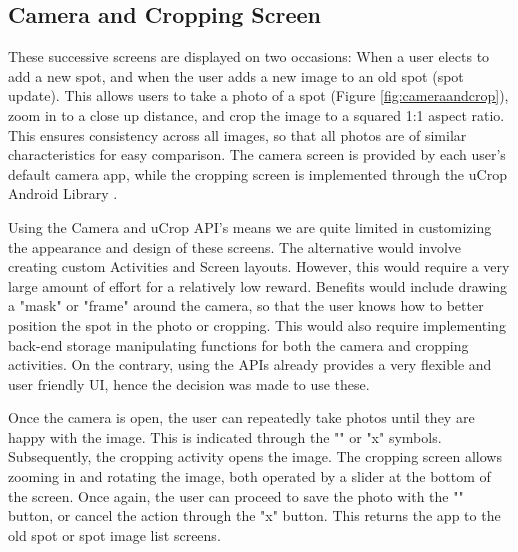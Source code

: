 \subsection{Camera and Cropping Screen}
These successive screens are displayed on two occasions: When a user elects to add a new spot, and when the user adds a new image to an old spot (spot update). This allows users to take a photo of a spot (Figure \ref{fig:cameraandcrop}), zoom in to a close up distance, and crop the image to a squared 1:1 aspect ratio. This ensures consistency across all images, so that all photos are of similar characteristics for easy comparison. The camera screen is provided by each user's default camera app, while the cropping screen is implemented through the uCrop Android Library \cite{yalantis_2019}. 

Using the Camera and uCrop API's means we are quite limited in customizing the appearance and design of these screens. The alternative would involve creating custom Activities and Screen layouts. However, this would require a very large amount of effort for a relatively low reward. Benefits would include drawing a "mask" or "frame" around the camera, so that the user knows how to better position the spot in the photo or cropping. This would also require implementing back-end storage manipulating functions for both the camera and cropping activities. On the contrary, using the APIs already provides a very flexible and user friendly UI, hence the decision was made to use these. 

Once the camera is open, the user can repeatedly take photos until they are happy with the image. This is indicated through the "\checkmark" or "x" symbols. Subsequently, the cropping activity opens the image. The cropping screen allows zooming in and rotating the image, both operated by a slider at the bottom of the screen. Once again, the user can proceed to save the photo with the "\checkmark" button, or cancel the action through the "x" button. This returns the app to the old spot or spot image list screens.

